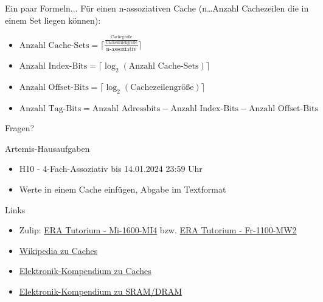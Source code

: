 \documentclass[
  german,            %
  aspectratio=169,    %
]{tumbeamer}
\begin{document}
\begin{frame}[c, fragile]{Ein paar Formeln$\ldots$}
  Für einen n-assoziativen Cache (n\ldots Anzahl Cachezeilen die in einem Set liegen können):
  \vspace{0.25cm}
  \begin{itemize}
    \item $\textrm{Anzahl Cache-Sets}=\lceil\frac{\frac{\textrm{Cachegröße}}{\textrm{Cachezeilengröße}}}{\textrm{n-assoziativ}}\rceil$
    \item $\textrm{Anzahl Index-Bits}=\lceil\log_2(\textrm{Anzahl Cache-Sets})\rceil$
    \item $\textrm{Anzahl Offset-Bits}=\lceil\log_2(\textrm{Cachezeilengröße})\rceil$
    \item $\textrm{Anzahl Tag-Bits}= \textrm{Anzahl Adressbits} - \textrm{Anzahl Index-Bits} - \textrm{Anzahl Offset-Bits}$
  \end{itemize}
\end{frame}


\begin{frame}[c]{}{}
  \begin{center}
    \LARGE Fragen?
  \end{center}
\end{frame}

\begin{frame}[c, fragile]{Artemis-Hausaufgaben}{}
  \begin{itemize}
    \item H10 - 4-Fach-Assoziativ bis 14.01.2024 23:59 Uhr
    \item Werte in einem Cache einfügen, Abgabe im Textformat
  \end{itemize}
\end{frame}

\begin{frame}[fragile, c]{Links}{}
  \begin{itemize}
    \item Zulip: \href{https://zulip.in.tum.de/#narrow/stream/1917-ERA-Tutorium---Mi-1600-MI4}{\glqq ERA Tutorium - Mi-1600-MI4\grqq}
          bzw. \href{https://zulip.in.tum.de/#narrow/stream/1940-ERA-Tutorium---Fr-1100-MW2}{\glqq ERA Tutorium - Fr-1100-MW2\grqq}
    \item \href{https://en.wikipedia.org/wiki/Cache_placement_policies}{Wikipedia zu Caches}
    \item \href{https://www.elektronik-kompendium.de/sites/com/0309291.htm}{Elektronik-Kompendium zu Caches}
    \item \href{https://www.elektronik-kompendium.de/sites/com/0309191.htm}{Elektronik-Kompendium zu SRAM/DRAM}
  \end{itemize}
\end{frame}

\maketitle
\end{document}
